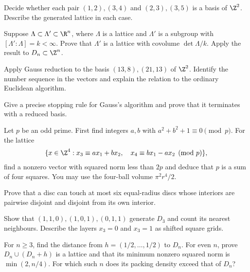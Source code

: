 \begin{exercise}[$\star$]\label{geometry:ex:basisZ2}
Decide whether each pair $(1,2),(3,4)$ and $(2,3),(3,5)$ is a basis of
$\Z^2$. Describe the generated lattice in each case.
\end{exercise}
\begin{exercise}[$\star$]\label{geometry:ex:index}
Suppose $\Lambda\subset\Lambda'\subset\R^n$, where $\Lambda$ is a
lattice and $\Lambda'$ is a subgroup with $[\Lambda':\Lambda]=k<\infty$.
Prove that $\Lambda'$ is a lattice with covolume $\det\Lambda/k$.
Apply the result to $D_n\subset\Z^n$.
\end{exercise}
\begin{exercise}[$\star$]\label{geometry:ex:gaussreduce}
Apply Gauss reduction to the basis $(13,8),(21,13)$ of $\Z^2$.
Identify the number sequence in the vectors and explain the relation to
the ordinary Euclidean algorithm.
\end{exercise}
\begin{exercise}[$\star\star$]\label{geometry:ex:gaussterminates}
Give a precise stopping rule for Gauss's algorithm and prove that it
terminates with a reduced basis.
\end{exercise}
\begin{exercise}[$\star\star$]\label{geometry:ex:foursquares}
Let $p$ be an odd prime. First find integers $a,b$ with
$a^2+b^2+1\equiv0\pmod p$. For the lattice
\[
 \{x\in\Z^4:x_3\equiv ax_1+bx_2,\quad
 x_4\equiv bx_1-ax_2\pmod p\},
\]
find a nonzero vector with squared norm less than $2p$ and deduce that
$p$ is a sum of four squares. You may use the four-ball volume
$\pi^2r^4/2$.
\end{exercise}
\begin{exercise}[$\star$]\label{geometry:ex:kissing2}
Prove that a disc can touch at most six equal-radius discs whose interiors
are pairwise disjoint and disjoint from its own interior.
\end{exercise}
\begin{exercise}[$\star\star$]\label{geometry:ex:fcc}
Show that $(1,1,0),(1,0,1),(0,1,1)$ generate $D_3$ and count its nearest
neighbours. Describe the layers $x_3=0$ and $x_3=1$ as shifted square grids.
\end{exercise}
\begin{exercise}[$\star\star$]\label{geometry:ex:deephole}
For $n\ge3$, find the distance from $h=(1/2,\ldots,1/2)$ to $D_n$.
For even $n$, prove $D_n\cup(D_n+h)$ is a lattice and that its minimum
nonzero squared norm is $\min(2,n/4)$. For which such $n$ does its
packing density exceed that of $D_n$?
\end{exercise}
